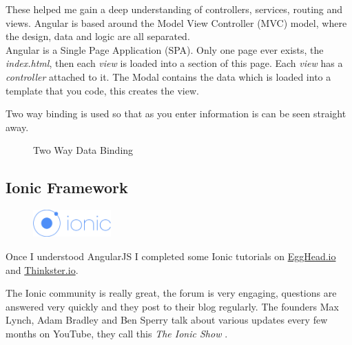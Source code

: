 These helped me gain a deep understanding of controllers, services, routing and views.
Angular is based around the Model View Controller (MVC) model, where the design, data and logic are all separated.
\\
Angular is a Single Page Application (SPA). Only one page ever exists, the \textit{index.html}, then each \textit{view} is loaded into a section of this page.
Each \textit{view} has a \textit{controller} attached to it. 
The Modal contains the data which is loaded into a template that you code, this creates the view.

Two way binding is used so that as you enter information is can be seen straight away.
\begin{figure}[H] 
	\caption{Two Way Data Binding}
	\label{fig:speciation}
\end{figure}

\subsection{Ionic Framework}
\begin{figure}
	\includegraphics[width=3cm]{img/mobile-app/logos/ionic.png}
\end{figure} 
Once I understood AngularJS I completed some Ionic tutorials on \url{EggHead.io} and \url{Thinkster.io}.

The Ionic \cite{ionic} community is really great, the forum is very engaging, questions are answered very quickly and they post to their blog regularly.
The  founders Max Lynch, Adam Bradley and Ben Sperry talk about various updates every few months on YouTube, they call this \textit{The Ionic Show} \cite{ionic_show}.
\\

